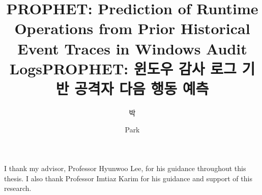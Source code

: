 \documentclass[bachelor,english,final,pdfdoc]{kentech-ucs}
\title[eng-full]{PROPHET: Prediction of Runtime Operations from Prior Historical Event Traces in Windows Audit Logs}
\title[kor]{PROPHET: 윈도우 감사 로그 기반 공격자 다음 행동 예측}
\author[korean]{박}{윤근}
\author[english]{Park}{Yoonkeun}
\begin{document}

\makecontents















\appendix











%
\acknowledgment[3]
I thank my advisor, Professor Hyunwoo Lee, for his guidance throughout
this thesis. I also thank Professor Imtiaz Karim for his guidance and
support of this research.

\label{paperlastpagelabel}
\end{document}
